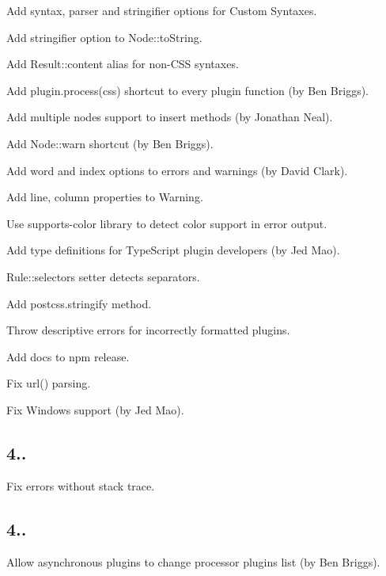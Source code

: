 \begin{DoxyItemize}
\item Add {\ttfamily syntax}, {\ttfamily parser} and {\ttfamily stringifier} options for Custom Syntaxes.
\item Add stringifier option to {\ttfamily Node\+::to\+String}.
\item Add {\ttfamily Result\+::content} alias for non-\/\+C\+SS syntaxes.
\item Add {\ttfamily plugin.\+process(css)} shortcut to every plugin function (by Ben Briggs).
\item Add multiple nodes support to insert methods (by Jonathan Neal).
\item Add {\ttfamily Node\+::warn} shortcut (by Ben Briggs).
\item Add {\ttfamily word} and {\ttfamily index} options to errors and warnings (by David Clark).
\item Add {\ttfamily line}, {\ttfamily column} properties to {\ttfamily Warning}.
\item Use {\ttfamily supports-\/color} library to detect color support in error output.
\item Add type definitions for Type\+Script plugin developers (by Jed Mao).
\item {\ttfamily Rule\+::selectors} setter detects separators.
\item Add {\ttfamily postcss.\+stringify} method.
\item Throw descriptive errors for incorrectly formatted plugins.
\item Add docs to npm release.
\item Fix {\ttfamily url()} parsing.
\item Fix Windows support (by Jed Mao).
\end{DoxyItemize}

\subsection*{4..}


\begin{DoxyItemize}
\item Fix errors without stack trace.
\end{DoxyItemize}

\subsection*{4..}


\begin{DoxyItemize}
\item Allow asynchronous plugins to change processor plugins list (by Ben Briggs).
\end{DoxyItemize}

